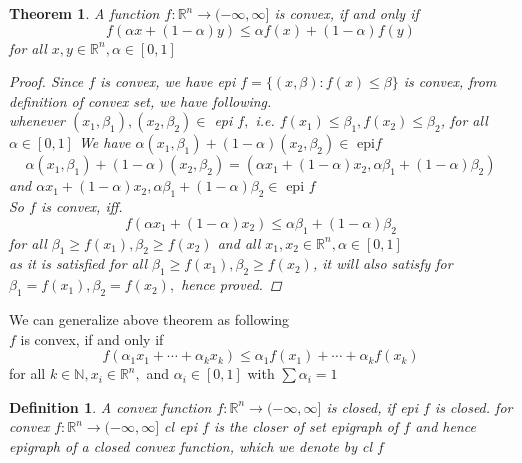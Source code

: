 \documentclass[oneside]{book}
\newtheorem{theorem}{Theorem}[section]
\newtheorem{mydef}{Definition}[section]
\begin{document}
	
	\begin{theorem}
		\label{t:7}
		A function $f: \mathbb{R}^{n} \rightarrow(-\infty, \infty]$ is convex, if and only if
		$$
		f(\alpha x+(1-\alpha) y) \leq \alpha f(x)+(1-\alpha) f(y)
		$$
		for all $x, y \in \mathbb{R}^{n}, \alpha \in[0,1]$
		\begin{proof}
			
			Since $f$ is convex, we have epi $f=\{(x, \beta): f(x) \leq \beta\}$ is convex, from definition of convex set, we have following. \\
			whenever $\left(x_{1}, \beta_{1}\right),\left(x_{2}, \beta_{2}\right) \in$ epi $f,$ i.e. $f\left(x_{1}\right) \leq \beta_{1}, f\left(x_{2}\right) \leq \beta_{2}$, for all $\alpha \in[0,1]$
			We have
			$\alpha\left(x_{1}, \beta_{1}\right)+(1-\alpha)\left(x_{2}, \beta_{2}\right) \in \text{ epi} f$
			$$
			\alpha\left(x_{1}, \beta_{1}\right)+(1-\alpha)\left(x_{2}, \beta_{2}\right)=  \left(\alpha x_{1}+(1-\alpha) x_{2}, \alpha \beta_{1}+(1-\alpha) \beta_{2}\right)
			$$
			and  $ \alpha x_{1}+(1-\alpha) x_{2}, \alpha \beta_{1}+(1-\alpha) \beta_{2} \in \text { epi } f $
			\\
			So $f$ is convex, iff.
			$$
			f\left(\alpha x_{1}+(1-\alpha) x_{2}\right) \leq \alpha \beta_{1}+(1-\alpha) \beta_{2}
			$$
			for   all $ \beta_{1} \geq f\left(x_{1}\right), \beta_{2} \geq f\left(x_{2}\right) $ and  all $ x_{1}, x_{2} \in \mathbb{R}^{n}, \alpha \in[0,1]$ \\
			as it is satisfied for all $ \beta_{1} \geq f\left(x_{1}\right), \beta_{2} \geq f\left(x_{2}\right) $, it will also satisfy for $\beta_{1}=f\left(x_{1}\right), \beta_{2}=f\left(x_{2}\right),$  hence proved.  
		\end{proof}
	\end{theorem} 
	
	We can  generalize above theorem as following \\
	$f$ is convex, if and only if
	\begin{equation}
	\label{eq41}
	f\left(\alpha_{1} x_{1}+\cdots+\alpha_{k} x_{k}\right) \leq \alpha_{1} f\left(x_{1}\right)+\cdots+\alpha_{k} f\left(x_{k}\right)
	\end{equation}
	for all $k \in \mathbb{N}, x_{i} \in \mathbb{R}^{n},$ and $\alpha_{i} \in[0,1]$ with $\sum \alpha_{i}=1$
	
	
	
	\begin{mydef} \label{d:11}
		A convex function $f: \mathbb{R}^{n} \rightarrow(-\infty, \infty]$ is closed, if epi $f$ is closed.
		for convex  $f: \mathbb{R}^{n} \rightarrow(-\infty, \infty]$   cl epi $f$ is the closer of set epigraph of $f$ and hence epigraph of a closed convex function, which we denote by cl $f$
	\end{mydef}
	
\end{document}
